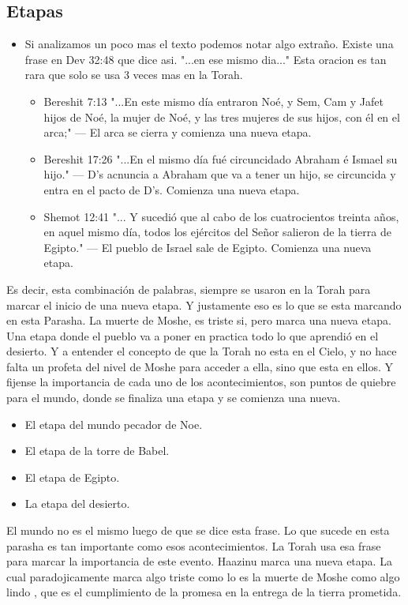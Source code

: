 \documentclass[conference]{IEEEtran}
\begin{document}
\begin{enumerate}
\subsection{Etapas}
\begin{itemize}
\item Si analizamos un poco mas el texto podemos notar algo extraño. Existe una frase en Dev 32:48 que dice asi.
"...en ese mismo dia..." Esta oracion es tan rara que solo se usa 3 veces mas en la Torah. 
\begin{itemize}
\item Bereshit 7:13 "...En este mismo día entraron Noé, y Sem, Cam y Jafet hijos de Noé, la mujer de Noé, y las tres mujeres de sus hijos, con él en el arca;"  --- El arca se cierra y comienza una nueva etapa.
\item Bereshit 17:26 "...En el mismo día fué circuncidado Abraham é Ismael su hijo." --- D's acnuncia a Abraham que va a tener un hijo, se circuncida y entra en el pacto de D's. Comienza una nueva etapa.
\item Shemot 12:41 "...	Y sucedió que al cabo de los cuatrocientos treinta años, en aquel mismo día, todos los ejércitos del Señor salieron de la tierra de Egipto." --- El pueblo de Israel sale de Egipto. Comienza una nueva etapa.
\end{itemize}
\end{itemize}

Es decir, esta combinación de palabras, siempre se usaron en la Torah para marcar el inicio de una nueva etapa. 
Y justamente eso es lo que se esta marcando en esta Parasha. La muerte  de Moshe, es triste si, pero marca una nueva etapa. 
Una etapa donde el pueblo va a poner en practica todo lo que aprendió en el desierto. Y a entender el concepto de que la Torah no esta en el Cielo, y no hace falta un profeta del nivel de Moshe para acceder a ella, sino que esta en ellos.
Y fijense la importancia de cada uno de los  acontecimientos, son puntos de quiebre para el mundo, donde se finaliza una etapa y se comienza una nueva.
\begin{itemize}
\item
El etapa del mundo pecador de Noe.
\item
El etapa de la torre de Babel.
\item
El etapa de Egipto.
\item
La etapa del desierto.
\end{itemize}

El mundo no es el mismo luego de que se dice esta frase.
Lo que sucede en esta parasha es tan importante como esos acontecimientos. 
La Torah usa esa frase para marcar la importancia de este evento. 
Haazinu marca una nueva etapa. La cual paradojicamente marca algo triste como lo es la muerte de Moshe como algo lindo , que es el cumplimiento de la promesa en la entrega de la tierra prometida.


\end{enumerate}
\end{document}
